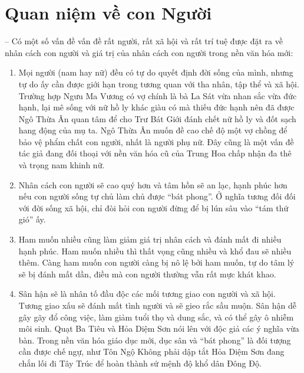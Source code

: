 \section{Quan niệm về con Người} %
\label{sec:59_60_con_nguoi}

-- Có một số vấn đề vấn đề rất người, rất xã hội và rất trí tuệ được đặt ra về nhân cách con người và giá trị của nhân cách con người trong nền văn hóa mới:

\begin{enumerate}[label=\itshape\alph*\upshape/]

    \item Mọi người (nam hay nữ) đều có tự do quyết định đời sống của mình, nhưng tự do ấy cần được giới hạn trong tương quan với tha nhân, tập thể và xã hội. Trường hợp Ngưu Ma Vương có vợ chính là bà La Sát vừa nhan sắc vừa đức hạnh, lại mê sống với nữ hồ ly khác giàu có mà thiếu đức hạnh nên đã được Ngô Thừa Ân quan tâm để cho Trư Bát Giới đánh chết nữ hồ ly và đốt sạch hang động của mụ ta. Ngô Thừa Ân muốn đề cao chế độ một vợ chồng để bảo vệ phẩm chất con người, nhất là người phụ nữ. Đây cũng là một vấn đề tác giả đang đối thoại với nền văn hóa cũ của Trung Hoa chấp nhận đa thê và trọng nam khinh nữ.

    \item Nhân cách con người sẽ cao quý hơn và tâm hồn sẽ an lạc, hạnh phúc hơn nếu con người sống tự chủ làm chủ được ``bát phong''. Ở nghĩa tương đối đối với đời sống xã hội, chỉ đòi hỏi con người đừng để bị lún sâu vào ``tám thứ gió'' ấy.

    \item Ham muốn nhiều cũng làm giảm giá trị nhân cách và đánh mất đi nhiều hạnh phúc. Ham muốn nhiều thì thất vọng cũng nhiều và khổ đau sẽ nhiều thêm. Càng ham muốn con người càng bị nô lệ bởi ham muốn, tự do tâm lý sẽ bị đánh mất dần, điều mà con người thường vẫn rất mực khát khao.

    \item Sân hận sẽ là nhân tố đầu độc các mối tương giao con người và xã hội. Tương giao xấu sẽ đánh mất tình người và sẽ gieo rắc sầu muộn. Sân hận dễ gây gãy đổ công việc, làm giảm tuổi thọ và dung sắc, và có thể gây ô nhiễm môi sinh. Quạt Ba Tiêu và Hỏa Diệm Sơn nói lên với độc giả các ý nghĩa vừa bàn. Trong nền văn hóa giáo dục mới, dục sân và ``bát phong'' là đối tượng cần được chế ngự, như Tôn Ngộ Không phải dập tắt Hỏa Diệm Sơn đang chắn lối đi Tây Trúc để hoàn thành sứ mệnh độ khổ dân Đông Độ.
\end{enumerate}

